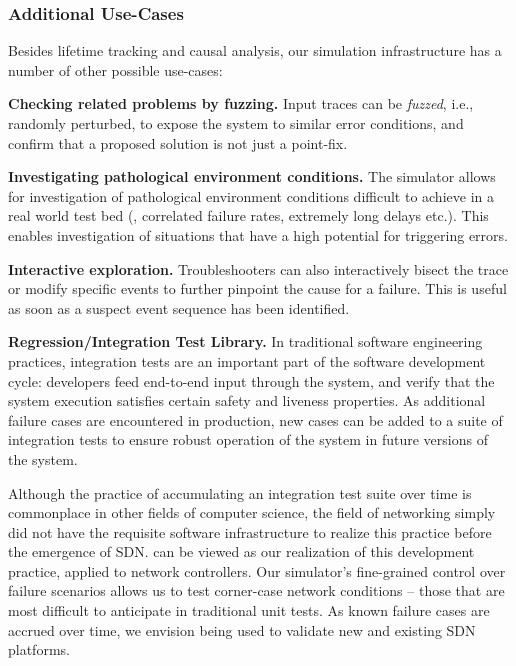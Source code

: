 \subsubsection{Additional Use-Cases} Besides lifetime tracking and causal analysis, our simulation infrastructure has a
number of other possible use-cases:

\noindent\textbf{Checking related problems by fuzzing.} Input traces can be \emph{fuzzed}, i.e.,
randomly perturbed, to expose the system to similar error conditions, and confirm
that a proposed solution is not just a point-fix. 

\noindent\textbf{Investigating pathological environment conditions.} The simulator allows for investigation
of pathological environment conditions difficult to achieve in a real world test bed
(\eg{}, correlated failure rates, extremely long delays etc.). This enables
investigation of situations that have a high potential for triggering errors.

\noindent\textbf{Interactive exploration.} Troubleshooters can also interactively bisect
the trace or modify specific events to further pinpoint the cause for a failure.
This is useful as soon as a suspect event sequence has been identified.

\noindent\textbf{Regression/Integration Test Library.} In traditional software engineering practices,
integration tests are an
important part of the software development cycle: developers feed end-to-end
input through the system, and verify that the system execution satisfies
certain safety and liveness properties. As additional failure cases are encountered in
production, new cases can be added to a suite of integration tests to
ensure robust operation of the system in future versions of the system.

Although the practice of accumulating an integration test suite over time is
commonplace in other fields of computer science, the field of networking
simply did not have the requisite software infrastructure to realize this practice before the emergence
of SDN. \Simulator{} can be viewed as our realization
of this development practice, applied to network controllers. Our simulator's fine-grained control over
failure scenarios allows us to test corner-case network conditions -- those
that are most difficult to anticipate in traditional unit tests.
As known failure cases are accrued over time, we envision \simulator{} being used to validate
new and existing SDN platforms.

